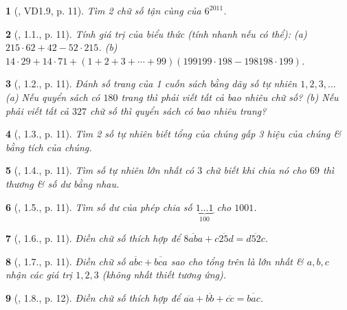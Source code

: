\documentclass{article}
\newtheorem{baitoan}{}
\begin{document}
\begin{baitoan}[\cite{TLCT_THCS_Toan_6_so_hoc}, VD1.9, p. 11]
	Tìm 2 chữ số tận cùng của $6^{2011}$.
\end{baitoan}

\begin{baitoan}[\cite{TLCT_THCS_Toan_6_so_hoc}, 1.1., p. 11]
	Tính giá trị của biểu thức (tính nhanh nếu có thể): (a) $215\cdot62 + 42 - 52\cdot215$. (b) $14\cdot29 + 14\cdot71 + (1 + 2 + 3 + \cdots + 99)(199199\cdot198 - 198198\cdot199)$.
\end{baitoan}

\begin{baitoan}[\cite{TLCT_THCS_Toan_6_so_hoc}, 1.2., p. 11]
	Đánh số trang của 1 cuốn sách bằng dãy số tự nhiên $1,2,3,\ldots$ (a) Nếu quyển sách có $180$ trang thì phải viết tất cả bao nhiêu chữ số? (b) Nếu phải viết tất cả $327$ chữ số thì quyển sách có bao nhiêu trang?
\end{baitoan}

\begin{baitoan}[\cite{TLCT_THCS_Toan_6_so_hoc}, 1.3., p. 11]
	Tìm 2 số tự nhiên biết tổng của chúng gấp 3 hiệu của chúng \& bằng tích của chúng.
\end{baitoan}

\begin{baitoan}[\cite{TLCT_THCS_Toan_6_so_hoc}, 1.4., p. 11]
	Tìm số tự nhiên lớn nhất có $3$ chữ biết khi chia nó cho $69$ thì thương \& số dư bằng nhau.
\end{baitoan}

\begin{baitoan}[\cite{TLCT_THCS_Toan_6_so_hoc}, 1.5., p. 11]
	Tìm số dư của phép chia số $\underbrace{1\ldots1}_{100}$ cho $1001$.
\end{baitoan}

\begin{baitoan}[\cite{TLCT_THCS_Toan_6_so_hoc}, 1.6., p. 11]
	Điền chữ số thích hợp để $\overline{8aba} + \overline{c25d} = \overline{d52c}$.
\end{baitoan}

\begin{baitoan}[\cite{TLCT_THCS_Toan_6_so_hoc}, 1.7., p. 11]
	Điền chữ số $\overline{abc} + \overline{bca}$ sao cho tổng trên là lớn nhất \& $a,b,c$ nhận các giá trị $1,2,3$ (không nhất thiết tương ứng).
\end{baitoan}

\begin{baitoan}[\cite{TLCT_THCS_Toan_6_so_hoc}, 1.8., p. 12]
	Điền chữ số thích hợp để $\overline{aa} + \overline{bb} + \overline{cc} = \overline{bac}$.
\end{baitoan}
\end{document}
